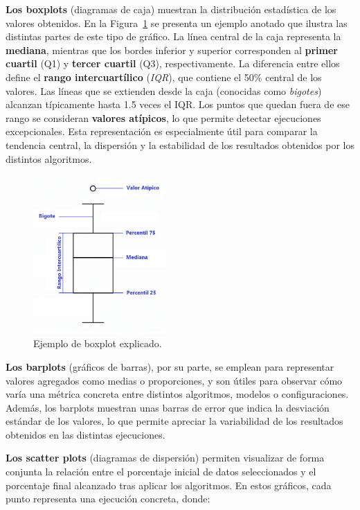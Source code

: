 \textbf{Los boxplots} (diagramas de caja) muestran la distribución estadística de los valores obtenidos.
En la Figura~\ref{fig:boxplot-explicado} se presenta un ejemplo anotado que ilustra las distintas partes de este tipo de gráfico.
La línea central de la caja representa la \textbf{mediana},
mientras que los bordes inferior y superior corresponden al \textbf{primer cuartil} (Q1) y \textbf{tercer cuartil} (Q3), respectivamente.
La diferencia entre ellos define el \textbf{rango intercuartílico} (\textit{IQR}), que contiene el 50\% central de los valores.
Las líneas que se extienden desde la caja (conocidas como \textit{bigotes}) alcanzan típicamente hasta 1.5 veces el IQR.
Los puntos que quedan fuera de ese rango se consideran \textbf{valores atípicos}, lo que permite detectar ejecuciones excepcionales.
Esta representación es especialmente útil para comparar la tendencia central, la dispersión y la estabilidad de los resultados obtenidos por los distintos algoritmos.

\begin{figure}[H]
    \centering
    \includegraphics[width=0.45\textwidth]{imagenes/boxplot-explicado.png}
    \caption{Ejemplo de boxplot explicado.}
    \label{fig:boxplot-explicado}
\end{figure}

\textbf{Los barplots} (gráficos de barras), por su parte, se emplean para representar valores agregados como medias o proporciones,
y son útiles para observar cómo varía una métrica concreta entre distintos algoritmos, modelos o configuraciones.
Además, los barplots muestran unas barras de error que indica la desviación estándar de los valores,
lo que permite apreciar la variabilidad de los resultados obtenidos en las distintas ejecuciones.

\textbf{Los scatter plots} (diagramas de dispersión) permiten visualizar de forma conjunta la relación entre el
porcentaje inicial de datos seleccionados y el porcentaje final alcanzado tras aplicar los algoritmos.
En estos gráficos, cada punto representa una ejecución concreta, donde:

